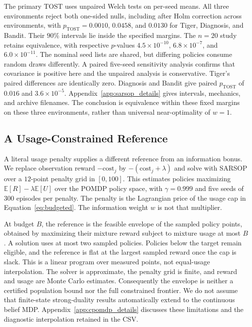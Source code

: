 The primary TOST uses unpaired Welch tests on per-seed means. All three environments reject both one-sided nulls, including after Holm correction across environments, with $p_{\mathrm{TOST}}=0.0010$, $0.0458$, and $0.0130$ for Tiger, Diagnosis, and Bandit. Their $90\%$ intervals lie inside the specified margins. The $n{=}20$ study retains equivalence, with respective $p$-values $4.5{\times}10^{-10}$, $6.8{\times}10^{-7}$, and $6.0{\times}10^{-11}$. The nominal seed lists are shared, but differing policies consume random draws differently. A paired five-seed sensitivity analysis confirms that covariance is positive here and the unpaired analysis is conservative. Tiger's paired differences are identically zero. Diagnosis and Bandit give paired $p_{\mathrm{TOST}}$ of $0.016$ and $3.6{\times}10^{-5}$. Appendix~\ref{app:sarsop_details} gives intervals, mechanics, and archive filenames. The conclusion is equivalence within these fixed margins on these three environments, rather than universal near-optimality of $w{=}1$.

\subsection{A Usage-Constrained Reference}
\label{sec:cpomdp}

A literal usage penalty supplies a different reference from an information bonus. We replace observation reward $-\mathrm{cost}_j$ by $-(\mathrm{cost}_j+\lambda)$ and solve with SARSOP over a $12$-point penalty grid in $[0,100]$. This estimates policies maximizing $\mathbb E[R]-\lambda\mathbb E[U]$ over the POMDP policy space, with $\gamma{=}0.999$ and five seeds of $300$ episodes per penalty. The penalty is the Lagrangian price of the usage cap in Equation~\ref{eq:budgeted}. The information weight $w$ is not that multiplier.

At budget $B$, the reference is the feasible envelope of the sampled policy points, obtained by maximizing their mixture reward subject to mixture usage at most $B$. A solution uses at most two sampled policies. Policies below the target remain eligible, and the reference is flat at the largest sampled reward once the cap is slack. This is a linear program over measured points, not equal-usage interpolation. The solver is approximate, the penalty grid is finite, and reward and usage are Monte Carlo estimates. Consequently the envelope is neither a certified population bound nor the full constrained frontier. We do not assume that finite-state strong-duality results \citep{altman1999} automatically extend to the continuous belief MDP. Appendix~\ref{app:cpomdp_details} discusses these limitations and the diagnostic interpolation retained in the CSV.

